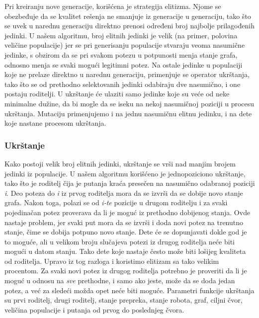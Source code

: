 \documentclass[12pt]{article}
\begin{document}
	Pri kreiranju nove generacije, korišćena je strategija elitizma. Njome se obezbeđuje da se kvalitet rešenja ne smanjuje iz generacije u generaciju, tako što se uvek u narednu generaciju direktno prenosi određeni broj najbolje prilagođenih jedinki. U našem algoritmu, broj elitnih jedinki je velik (na primer, polovina veličine populacije) jer se pri generisanju populacije stvaraju veoma nasumične jedinke, s obzirom da se pri svakom potezu u potpunosti menja stanje grafa, odnosno menja se svaki mogući legitimni potez. Na ostale jedinke u populaciji koje ne prelaze direktno u narednu generaciju, primenjuje se operator ukrštanja, tako što se od prethodno selektovanih jedinki odabiraju dve nasumično, i one postaju roditelji. U ukrštanje će ulaziti samo jedinke koje su veće od neke minimalne dužine, da bi mogle da se iseku na nekoj nasumičnoj poziciji u procesu ukrštanja. Mutaciju primenjujemo i na jednu nasumičnu elitnu jedinku, i na dete koje nastane procesom ukrštanja.
	\vspace*{1\baselineskip}
	
	
	\subsubsection{Ukrštanje}
	\label{subsec:podnaslov2}
	
	Kako postoji velik broj elitnih jedinki, ukrštanje se vrši nad manjim brojem jedinki iz populacije. U našem algoritmu korišćeno je jednopoziciono ukrštanje, tako što je roditelj čija je putanja kraća presečen na nasumično odabranoj poziciji \textit{i}. Deo poteza do \textit{i} iz prvog roditelja mora da se izvrši da se dobije novo stanje grafa. Nakon toga, polazi se od \textit{i-te} pozicije u drugom roditelju i za svaki pojedinačan potez proverava da li je moguć iz prethodno dobijenog stanja. Ovde nastaje problem, jer svaki put mora da se izvrši i doda novi potez na trenutno stanje, čime se dobija potpuno novo stanje. Dete će se dopunjavati dokle god je to moguće, ali u velikom broju slučajeva potezi iz drugog roditelja neće biti mogući u datom stanju. Tako dete koje nastaje često može biti lošijeg kvaliteta od roditelja. Upravo iz tog razloga i koristimo elitizam sa tako velikim procentom. Za svaki novi potez iz drugog roditelja potrebno je proveriti da li je moguć u odnosu na \textit{sve} prethodne, i samo ako jeste, može da se doda jedan potez, a već za sledeći možda opet neće biti moguće. Parametri funkcije ukrštanja su
	prvi roditelj, drugi roditelj, stanje prepreka, stanje robota, graf, ciljni čvor, veličina populacije i putanja od prvog do poslednjeg čvora.
\end{document}
